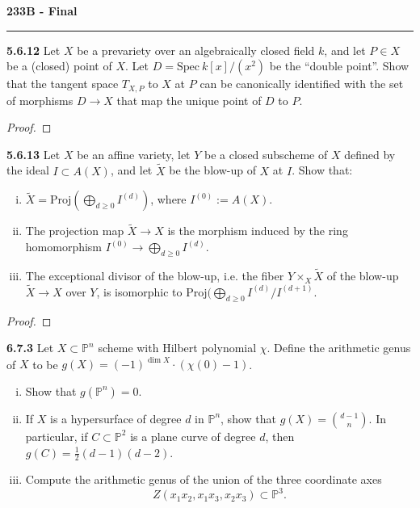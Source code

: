 \documentclass[11pt,letterpaper]{report}
\newcommand{\projective}{\mathbb{P}}
\newcommand{\Spec}{\text{Spec}}
\newcommand{\Proj}{\text{Proj}}
\begin{document}
\begin{center}
{\bf \Large 233B - Final} %
\vspace{0.2cm}
\hrule
\end{center}



\noindent\textbf{5.6.12}
Let $X$ be a prevariety over an algebraically closed field $k$, and let $P\in X$ be a (closed) point of $X$. Let $D = \Spec\ k[x]/(x^2)$ be the ``double point''. Show that the tangent space $T_{X,P}$ to $X$ at $P$ can be canonically identified with the set of morphisms $D\to X$ that map the unique point of $D$ to $P$.
\begin{proof}
	
\end{proof}

\noindent\textbf{5.6.13}
Let $X$ be an affine variety, let $Y$ be a closed subscheme of $X$ defined by the ideal $I\subset A(X)$, and let $\tilde{X}$ be the blow-up of $X$ at $I$. Show that:
\begin{enumerate}[(i)]
	\item $\tilde{X} = \Proj(\bigoplus_{d\geq 0}I^{(d)})$, where $I^{(0)}:= A(X)$.
	\item The projection map $\tilde{X}\to X$ is the morphism induced by the ring homomorphism $I^{(0)}\to \bigoplus_{d\geq 0}I^{(d)}$.
	\item The exceptional divisor of the blow-up, i.e. the fiber $Y\times_X\tilde{X}$ of the blow-up $\tilde{X}\to X$ over $Y$, is isomorphic to $\Proj(\bigoplus_{d\geq 0}I^{(d)}/I^{(d+1)}$.
\end{enumerate}
\begin{proof}
	
\end{proof}


\noindent\textbf{6.7.3}
Let $X\subset \projective^n$ scheme with Hilbert polynomial $\chi$. Define the arithmetic genus of $X$ to be $g(X) = (-1)^{\dim X}\cdot (\chi(0)-1)$.
\begin{enumerate}[(i)]
	\item Show that $g(\projective^n) = 0$.
	\item If $X$ is a hypersurface of degree $d$ in $\projective^n$, show that $g(X) = \binom{d-1}{n}$. In particular, if $C\subset \projective^2$ is a plane curve of degree $d$, then $g(C) = \frac{1}{2}(d-1)(d-2)$.
	\item Compute the arithmetic genus of the union of the three coordinate axes
	\[
	Z(x_1x_2, x_1x_3, x_2x_3)\subset \projective^3.
	\]
\end{enumerate}
\end{document}
